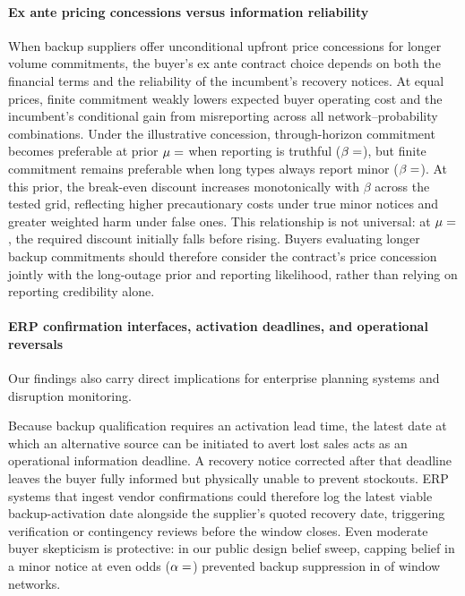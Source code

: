 \documentclass[preprint,11pt,authoryear]{elsarticle}
\begin{document}
\paragraph{Ex ante pricing concessions versus information reliability}
When backup suppliers offer unconditional upfront price concessions for longer volume commitments, the buyer's ex ante contract choice depends on both the financial terms and the reliability of the incumbent's recovery notices. At equal prices, finite commitment weakly lowers expected buyer operating cost and the incumbent's conditional gain from misreporting across all  network--probability combinations. Under the illustrative concession, through-horizon commitment becomes preferable at prior $\mu=\xa{mu2}$ when reporting is truthful ($\beta=\xa{beta0}$), but finite commitment remains preferable when long types always report minor ($\beta=\xa{beta4}$). At this prior, the break-even discount increases monotonically with $\beta$ across the tested grid, reflecting higher precautionary costs under true minor notices and greater weighted harm under false ones. This relationship is not universal: at $\mu=\xa{mu0}$, the required discount initially falls before rising. Buyers evaluating longer backup commitments should therefore consider the contract's price concession jointly with the long-outage prior and reporting likelihood, rather than relying on reporting credibility alone.

\paragraph{ERP confirmation interfaces, activation deadlines, and operational reversals}
Our findings also carry direct implications for enterprise planning systems and disruption monitoring.

Because backup qualification requires an activation lead time, the latest date at which an alternative source can be initiated to avert lost sales acts as an operational information deadline. A recovery notice corrected after that deadline leaves the buyer fully informed but physically unable to prevent stockouts. ERP systems that ingest vendor confirmations could therefore log the latest viable backup-activation date alongside the supplier's quoted recovery date, triggering verification or contingency reviews before the window closes. Even moderate buyer skepticism is protective: in our public design belief sweep, capping belief in a minor notice at even odds ($\alpha=\db{alpha2}$) prevented backup suppression in  of  window networks.
\end{document}
